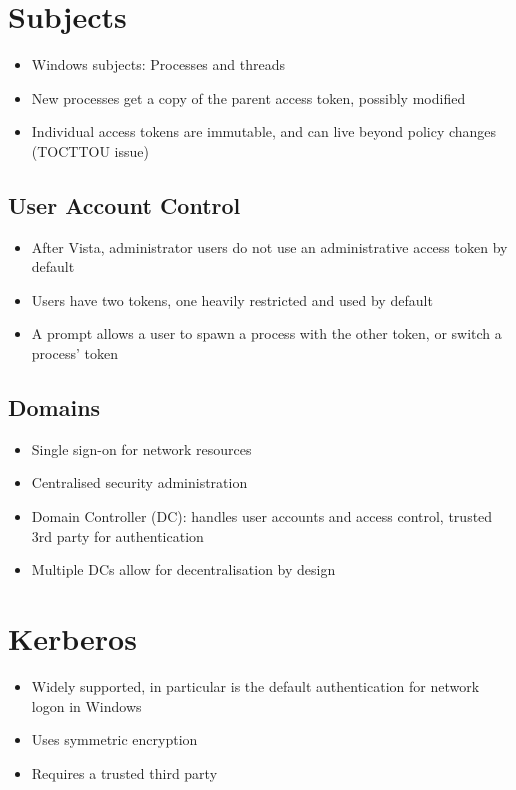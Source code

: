 \documentclass{article}
\begin{document}
\section{Subjects}
\begin{itemize}
  \item Windows subjects: Processes and threads 
  \item New processes get a copy of the parent access token, possibly modified 
  \item Individual access tokens are immutable, and can live beyond policy changes (TOCTTOU issue)
\end{itemize}

\subsection{User Account Control}
\begin{itemize}
  \item After Vista, administrator users do not use an administrative access token by default 
  \item Users have two tokens, one heavily restricted and used by default 
  \item A prompt allows a user to spawn a process with the other token, or switch a process’ token
\end{itemize}

\subsection{Domains}
\begin{itemize}
  \item Single sign-on for network resources 
  \item Centralised security administration 
  \item Domain Controller (DC): handles user accounts and access control, trusted 3rd party for authentication 
  \item Multiple DCs allow for decentralisation by design
\end{itemize}

\section{Kerberos}
\begin{itemize}
  \item Widely supported, in particular is the default authentication for network logon in Windows 
  \item Uses symmetric encryption 
  \item Requires a trusted third party
\end{itemize}
\end{document}
